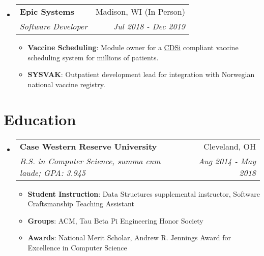 \documentclass[letterpaper,11pt]{article}
\makeatletter
\newenvironment{resumeHeadingList}{\begin{itemize}[leftmargin=*]}{\end{itemize}}
\newenvironment{resumeItemList}{\begin{itemize}}{\end{itemize}\vspace{-5pt}}
\newcommand{\resumeItem}[2]{
  \item\small{
    \textbf{#1}{: #2 \vspace{-2pt}}
  }
}
\newcommand{\resumeHeading}[4]{
  \vspace{-1pt}\item
    \begin{tabular*}{0.97\textwidth}[t]{l@{\extracolsep{\fill}}r}
      \textbf{#1} & #2 \\
      \textit{\small#3} & \textit{\small #4} \\
    \end{tabular*}\vspace{-5pt}
}
\newcommand{\resumeSubheading}[2]{
    \begin{tabular*}{0.97\textwidth}{l@{\extracolsep{\fill}}r}
      \textit{\small#1} & \textit{\small #2} \\
    \end{tabular*}\vspace{-5pt}
}
\newcommand{\icon}[4]{
  \raisebox{-#4\height}{\href{#2}{\texttt{[image: \#1]}}}
}
\makeatother
\begin{document}
\begin{resumeHeadingList}
\begin{resumeItemList}
          \resumeItem{Observability}{As Tech Lead, I pushed the team to take ownership over monitoring our own production system by aggregating logs usefully and building out dashboards in SumoLogic, rather than relying on SREs to detect issues.}
        \end{resumeItemList}
      \resumeSubheading
        {Software Engineer, Back End}{Mar 2020 - Jul 2021}
        \begin{resumeItemList}
          \resumeItem{Personalized search}{Developed a \href{https://niche.com/colleges/compare}{compare tool} to help prospective students directly compare schools by the facts they care most about and enhanced the \href{https://www.niche.com/colleges/search/college-quiz/}{search tool} to allow them to order results on the search page by weighting the factors they care most about (e.g. academics, safety, etc...) using a custom Elasticsearch Painless script.}
          \resumeItem{Partner integration}{Developed an in-house lead delivery system in 3 months to replace an unexpectedly sunset third party platform and seamlessly migrated this mission critical process while reducing operating costs.}
        \end{resumeItemList}
        
      \resumeHeading
      {\icon{img/epic.png}{https://epic.com}{4ex}{0.25}Epic Systems}{Madison, WI (In Person)}
      {Software Developer}{Jul 2018 - Dec 2019}
      \begin{resumeItemList}
        \resumeItem{Vaccine Scheduling}{Module owner for a \href{https://www.cdc.gov/vaccines/programs/iis/cdsi.html}{CDSi} compliant vaccine scheduling system for millions of patients.}
        \resumeItem{SYSVAK}{Outpatient development lead for integration with Norwegian national vaccine registry.}
      \end{resumeItemList}
    
  \end{resumeHeadingList}


\section{Education}
  \begin{resumeHeadingList}
    \resumeHeading
      {\icon{img/case.jpg}{https://case.edu}{4ex}{0.25}Case Western Reserve University}{Cleveland, OH}
      {B.S. in Computer Science, summa cum laude;  GPA: 3.945}{Aug 2014 - May 2018}
      \begin{resumeItemList}
        \resumeItem{Student Instruction}{Data Structures supplemental instructor, Software Craftsmanship Teaching Assistant}
        \resumeItem{Groups}{ACM, Tau Beta Pi Engineering Honor Society}
        \resumeItem{Awards}{National Merit Scholar, Andrew R. Jennings Award for Excellence in Computer Science}
      \end{resumeItemList}
  \end{resumeHeadingList}
\end{document}
